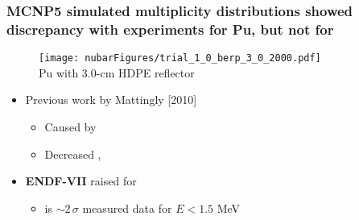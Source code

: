 \begin{frame}
    \frametitle{MCNP5 simulated multiplicity distributions showed discrepancy  with experiments for
        Pu, but not for }
\begin{minipage}{0.41\textwidth}
\begin{figure}[ht!]
\begin{center}
	{
	\texttt{[image: nubarFigures/trial\_1\_0\_berp\_3\_0\_2000.pdf]} \\
	{\footnotesize Pu with 3.0-cm HDPE reflector} }
\end{center}
\end{figure} 
\begin{figure}[ht!]
\begin{center}
\end{center}
\end{figure} 

\end{minipage}
\begin{minipage}{0.56\textwidth}
    {\fontsize{10.8pt}{10pt}\selectfont
    \addtolength\leftmargini{-0.5in}
     \addtolength\leftmarginii{-0.2in}
     \addtolength\wideitemsep{0.1in}
\begin{itemize}
  \item[] Previous work by Mattingly [2010]
      \vspace{-0.1in}
  \begin{itemize}
      \item Caused by \textbf{}  
	\vspace{-0.1505in}
\item  Decreased , \\ 
	\end{itemize}
\item[]  \textbf{ENDF-VII} raised \nubar for  \\ 
    \vspace{0.1in}
  \begin{itemize}
 		\item \nubar is $\sim2\,\sigma$  measured data for $E < 1.5$ MeV 
	\end{itemize} 
\end{itemize} }
\end{minipage}
\end{frame} 
